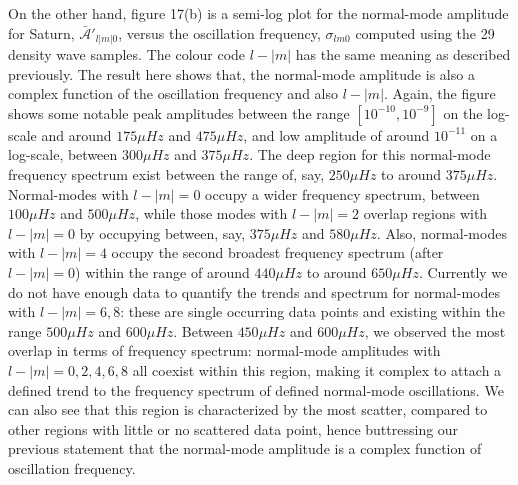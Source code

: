 \documentclass{article}
\begin{document}
On the other hand, figure 17(b) is a semi-log plot for the normal-mode amplitude for Saturn, $\mathscr{\bar{A}'}_{l|m|0}$, versus the oscillation frequency, $\sigma_{lm0}$ computed using the 29 density wave samples. The colour code $l-|m|$ has the same meaning as described previously. The result here shows that, the normal-mode amplitude is also a complex function of the oscillation frequency and also $l-|m|$. Again, the figure shows some notable peak amplitudes between the range $[10^{-10}, 10^{-9}]$ on the log-scale and around $175\mu Hz$ and $475\mu Hz$, and low amplitude of around $10^{-11}$ on a log-scale, between $300\mu Hz$ and $375\mu Hz$. The deep region for this normal-mode frequency spectrum exist between the range of, say, $250\mu Hz$ to around $375\mu Hz$. Normal-modes with $l-|m|=0$ occupy a wider frequency spectrum, between $100\mu Hz$ and $500\mu Hz$, while those modes with $l-|m|=2$ overlap regions with $l-|m|=0$ by occupying between, say,  $375\mu Hz$ and $580\mu Hz$. Also, normal-modes with $l-|m|=4$ occupy the second broadest frequency spectrum (after $l-|m|=0$) within the range of around $440\mu Hz$ to around $650\mu Hz$. Currently we do not have enough data to quantify the trends and spectrum for normal-modes with $l-|m|=6,8$: these are single occurring data points and existing within the range $500\mu Hz$ and $600\mu Hz$. Between  $450\mu Hz$ and $600\mu Hz$, we observed the most overlap in terms of frequency spectrum: normal-mode amplitudes with $l-|m|=0,2,4,6,8$ all coexist within this region, making it complex to attach a defined trend to the frequency spectrum of defined normal-mode oscillations. We can also see that this region is characterized by the most scatter, compared to other regions with little or no scattered data point, hence buttressing our previous statement that the normal-mode amplitude is a complex function of oscillation frequency. 
\end{document}
